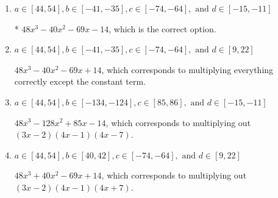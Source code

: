 \documentclass{extbook}[14pt]
\begin{document}
\begin{enumerate}
{\begin{enumerate}[label=\Alph*.]
$48x^{3} -104 x^{2} +27 x + 14$, which corresponds to multiplying out $(3x -2)(4x + 1)(4x -7)$.
\item \( a \in [44, 54], b \in [-41, -35], c \in [-74, -64], \text{ and } d \in [-15, -11] \)

* $48x^{3} -40 x^{2} -69 x -14$, which is the correct option.
\item \( a \in [44, 54], b \in [-41, -35], c \in [-74, -64], \text{ and } d \in [9, 22] \)

$48x^{3} -40 x^{2} -69 x + 14$, which corresponds to multiplying everything correctly except the constant term.
\item \( a \in [44, 54], b \in [-134, -124], c \in [85, 86], \text{ and } d \in [-15, -11] \)

$48x^{3} -128 x^{2} +85 x -14$, which corresponds to multiplying out $(3x -2)(4x -1)(4x -7)$.
\item \( a \in [44, 54], b \in [40, 42], c \in [-74, -64], \text{ and } d \in [9, 22] \)

$48x^{3} +40 x^{2} -69 x + 14$, which corresponds to multiplying out $(3x -2)(4x -1)(4x + 7)$.
\end{enumerate}

}
\end{enumerate}
\end{document}

